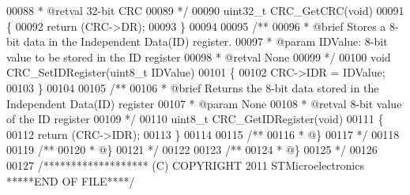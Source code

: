 \begin{DoxyCode}
00088 \textcolor{comment}{  * @retval 32-bit CRC}
00089 \textcolor{comment}{  */}
00090 uint32\_t CRC_GetCRC(\textcolor{keywordtype}{void})
00091 \{
00092   \textcolor{keywordflow}{return} (CRC->DR);
00093 \}
00094 
00095 \textcolor{comment}{/**}
00096 \textcolor{comment}{  * @brief  Stores a 8-bit data in the Independent Data(ID) register.}
00097 \textcolor{comment}{  * @param  IDValue: 8-bit value to be stored in the ID register                    }
00098 \textcolor{comment}{  * @retval None}
00099 \textcolor{comment}{  */}
00100 \textcolor{keywordtype}{void} CRC_SetIDRegister(uint8\_t IDValue)
00101 \{
00102   CRC->IDR = IDValue;
00103 \}
00104 
00105 \textcolor{comment}{/**}
00106 \textcolor{comment}{  * @brief  Returns the 8-bit data stored in the Independent Data(ID) register}
00107 \textcolor{comment}{  * @param  None}
00108 \textcolor{comment}{  * @retval 8-bit value of the ID register }
00109 \textcolor{comment}{  */}
00110 uint8\_t CRC_GetIDRegister(\textcolor{keywordtype}{void})
00111 \{
00112   \textcolor{keywordflow}{return} (CRC->IDR);
00113 \}
00114 
00115 \textcolor{comment}{/**}
00116 \textcolor{comment}{  * @\}}
00117 \textcolor{comment}{  */}
00118 
00119 \textcolor{comment}{/**}
00120 \textcolor{comment}{  * @\}}
00121 \textcolor{comment}{  */}
00122 
00123 \textcolor{comment}{/**}
00124 \textcolor{comment}{  * @\}}
00125 \textcolor{comment}{  */}
00126 
00127 \textcolor{comment}{/******************* (C) COPYRIGHT 2011 STMicroelectronics *****END OF FILE****/}
\end{DoxyCode}
